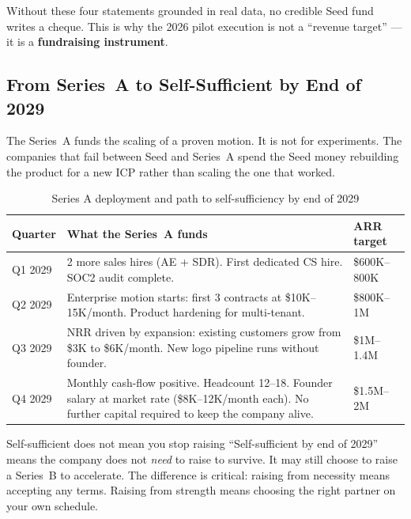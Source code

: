 \noindent Without these four statements grounded in real data, no credible
Seed fund writes a cheque. This is why the 2026 pilot execution is not a
``revenue target'' --- it is a \textbf{fundraising instrument}.

\subsection*{From Series~A to Self-Sufficient by End of 2029}

The Series~A funds the scaling of a proven motion. It is not for experiments.
The companies that fail between Seed and Series~A spend the Seed money
rebuilding the product for a new ICP rather than scaling the one that worked.

\begin{table}[H]
\centering
\renewcommand{\arraystretch}{1.5}
\begin{tabularx}{\textwidth}{@{}lXl@{}}
\toprule
\textbf{Quarter} & \textbf{What the Series~A funds} & \textbf{ARR target} \\
\midrule
Q1 2029 & 2 more sales hires (AE + SDR). First dedicated CS hire.
          SOC2 audit complete. & \$600K--800K \\
Q2 2029 & Enterprise motion starts: first 3 contracts at
          \$10K--15K/month. Product hardening for multi-tenant. & \$800K--1M \\
Q3 2029 & NRR driven by expansion: existing customers grow from
          \$3K to \$6K/month. New logo pipeline runs without founder. & \$1M--1.4M \\
Q4 2029 & Monthly cash-flow positive. Headcount 12--18. Founder salary
          at market rate (\$8K--12K/month each). No further capital required
          to keep the company alive. & \$1.5M--2M \\
\bottomrule
\end{tabularx}
\caption{Series A deployment and path to self-sufficiency by end of 2029}
\end{table}

\begin{insightbox}{Self-sufficient does not mean you stop raising}
``Self-sufficient by end of 2029'' means the company does not \emph{need}
to raise to survive. It may still choose to raise a Series~B to accelerate.
The difference is critical: raising from necessity means accepting any terms.
Raising from strength means choosing the right partner on your own schedule.
\end{insightbox}

